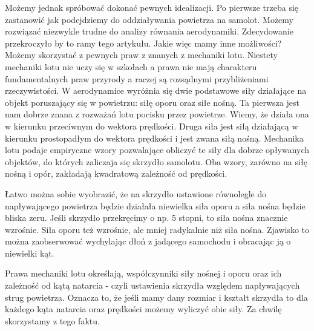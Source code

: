 \documentclass[10pt,twocolumn]{article}
\begin{document}
Możemy jednak spróbować dokonać pewnych idealizacji. Po pierwsze
trzeba się zastanowić jak podejdziemy do oddziaływania powietrza na
samolot. Możemy rozwiązać niezwykle trudne do analizy równania
aerodynamiki. Zdecydowanie przekroczyło by to ramy tego
artykułu. Jakie więc mamy inne możliwości? Możemy skorzystać z pewnych
praw z znanych z mechaniki lotu. Niestety mechaniki lotu nie uczy się
w szkołach a prawa nie mają charakteru fundamentalnych praw przyrody a
raczej są rozsądnymi przybliżeniami rzeczywistości. W aerodynamice
wyróżnia się dwie podstawowe siły działające na objekt poruszający się
w powietrzu: siłę oporu oraz siłe nośną. Ta pierwsza jest nam dobrze
znana z rozważań lotu pocisku przez powietrze. Wiemy, że działa ona w
kierunku przeciwnym do wektora prędkości. Druga siła jest siłą
działającą w kierunku prostopadłym do wektora prędkości i jest zwana
siłą nośną. Mechanika lotu podaje empiryczne wzory pozwalające
obliczyć te siły dla dobrze opływanych objektów, do których zaliczaja
się skrzydło samolotu. Oba wzory, zarówno na siłę nośną i opór,
zakładają kwadratową zależność od prędkości.

Łatwo można sobie wyobrazić, że na skrzydło ustawione równolegle do
napływającego powietrza będzie działała niewielka siła oporu a siła
nośna będzie bliska zeru. Jeśli skrzydło przekręcimy o np. 5 stopni,
to siła nośna znacznie wzrośnie. Siła oporu też wzrośnie, ale mniej
radykalnie niż siła nośna. Zjawisko to można zaobserwować wychylając
dłoń z jadącego samochodu i obracając ją o niewielki kąt.

Prawa mechaniki lotu określają, współczynniki siły nośnej i oporu oraz
ich zależność od kątą natarcia - czyli ustawienia skrzydła względem
napływających strug powietrza. Oznacza to, że jeśli mamy dany rozmiar
i kształt skrzydła to dla każdego kąta natarcia oraz prędkości możemy
wyliczyć obie siły. Za chwilę skorzystamy z tego faktu.
\end{document}
